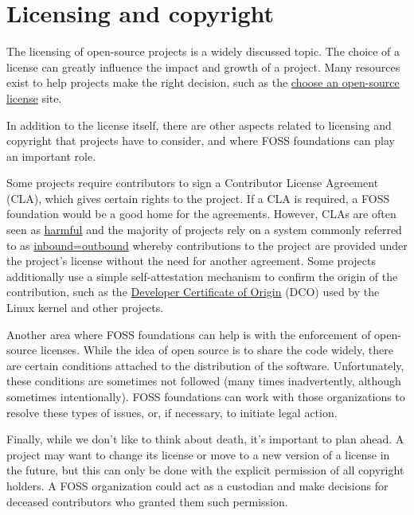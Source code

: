 


\chapter{Licensing and copyright}

The licensing of open-source projects is a widely discussed topic.  The choice of a license can greatly influence the impact and growth of a project.  Many resources exist to help projects make the right decision, such as the \href{https://choosealicense.com/}{choose an open-source license} site.

In addition to the license itself, there are other aspects related to licensing and copyright that projects have to consider, and where FOSS foundations can play an important role.

Some projects require contributors to sign a Contributor License Agreement (CLA), which gives certain rights to the project.  If a CLA is required, a FOSS foundation would be a good home for the agreements.  However, CLAs are often seen as \href{https://opensource.com/article/19/2/cla-problems}{harmful} and the majority of projects rely on a system commonly referred to as \href{https://opensource.com/law/11/7/trouble-harmony-part-1}{inbound=outbound} whereby contributions to the project are provided under the project's license without the need for another agreement.  Some projects additionally use a simple self-attestation mechanism to confirm the origin of the contribution, such as the \href{https://developercertificate.org/}{Developer Certificate of Origin} (DCO) used by the Linux kernel and other projects.

Another area where FOSS foundations can help is with the enforcement of open-source licenses.  While the idea of open source is to share the code widely, there are certain conditions attached to the distribution of the software.  Unfortunately, these conditions are sometimes not followed (many times inadvertently, although sometimes intentionally).  FOSS foundations can work with those organizations to resolve these types of issues, or, if necessary, to initiate legal action.

Finally, while we don't like to think about death, it's important to plan ahead.  A project may want to change its license or move to a new version of a license in the future, but this can only be done with the explicit permission of all copyright holders.  A FOSS organization could act as a custodian and make decisions for deceased contributors who granted them such permission.

